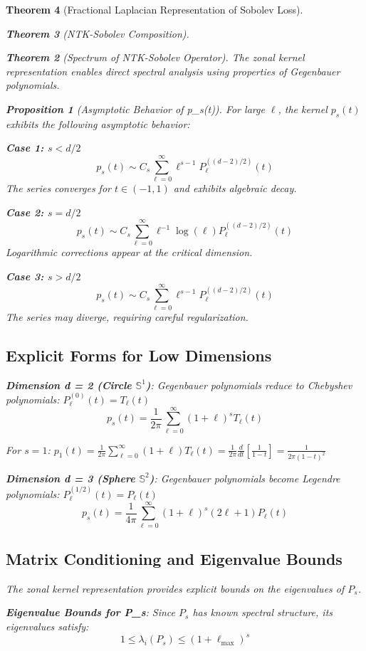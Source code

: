 \documentclass{article}
\newtheorem{theorem}{Theorem}[section]
\newtheorem{proposition}[theorem]{Proposition}
\begin{document}
\begin{theorem}[Fractional Laplacian Representation of Sobolev Loss]
\begin{theorem}[NTK-Sobolev Composition]
\begin{theorem}[Spectrum of NTK-Sobolev Operator]
The zonal kernel representation enables direct spectral analysis using properties of Gegenbauer polynomials.

\begin{proposition}[Asymptotic Behavior of p_s(t)]
For large $\ell$, the kernel $p_s(t)$ exhibits the following asymptotic behavior:

\textbf{Case 1: $s < d/2$}
\[ p_s(t) \sim C_s \sum_{\ell=0}^{\infty} \ell^{s-1} P_\ell^{((d-2)/2)}(t) \]
The series converges for $t \in (-1, 1)$ and exhibits algebraic decay.

\textbf{Case 2: $s = d/2$} 
\[ p_s(t) \sim C_s \sum_{\ell=0}^{\infty} \ell^{-1} \log(\ell) P_\ell^{((d-2)/2)}(t) \]
Logarithmic corrections appear at the critical dimension.

\textbf{Case 3: $s > d/2$}
\[ p_s(t) \sim C_s \sum_{\ell=0}^{\infty} \ell^{s-1} P_\ell^{((d-2)/2)}(t) \]
The series may diverge, requiring careful regularization.
\end{proposition}

\subsection{Explicit Forms for Low Dimensions}

\textbf{Dimension d = 2 (Circle $\mathbb{S}^1$)}:
Gegenbauer polynomials reduce to Chebyshev polynomials: $P_\ell^{(0)}(t) = T_\ell(t)$
\[ p_s(t) = \frac{1}{2\pi} \sum_{\ell=0}^{\infty} (1 + \ell)^s T_\ell(t) \]

For $s = 1$: $p_1(t) = \frac{1}{2\pi} \sum_{\ell=0}^{\infty} (1 + \ell) T_\ell(t) = \frac{1}{2\pi} \frac{d}{dt}\left[\frac{1}{1-t}\right] = \frac{1}{2\pi(1-t)^2}$

\textbf{Dimension d = 3 (Sphere $\mathbb{S}^2$)}:
Gegenbauer polynomials become Legendre polynomials: $P_\ell^{(1/2)}(t) = P_\ell(t)$
\[ p_s(t) = \frac{1}{4\pi} \sum_{\ell=0}^{\infty} (1 + \ell)^s (2\ell + 1) P_\ell(t) \]

\subsection{Matrix Conditioning and Eigenvalue Bounds}

The zonal kernel representation provides explicit bounds on the eigenvalues of $P_s$.

\textbf{Eigenvalue Bounds for P_s}: Since $P_s$ has known spectral structure, its eigenvalues satisfy:
\[ 1 \leq \lambda_i(P_s) \leq (1 + \ell_{\max})^s \]


\end{theorem}
\end{theorem}
\end{theorem}
\end{document}
